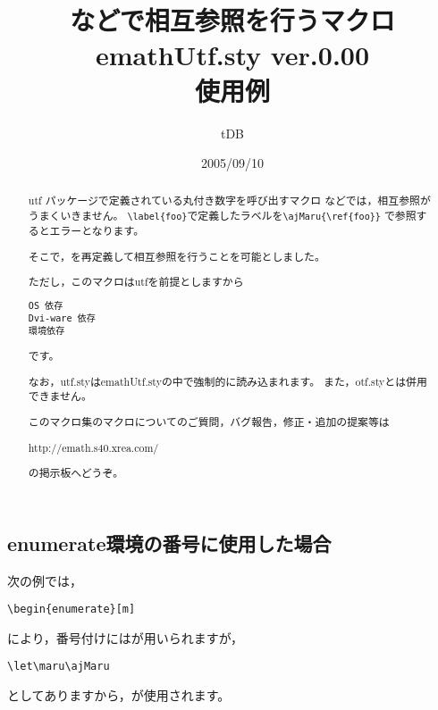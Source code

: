 \documentclass[a4j]{jarticle}
\begin{document}
\title{などで相互参照を行うマクロ\\
emathUtf.sty {\normalsize ver.0.00}\\使用例}
\author{tDB}
\date{2005/09/10}

\maketitle\thispagestyle{empty}
\begin{abstract}%
\zw%
utf パッケージで定義されている丸付き数字を呼び出すマクロ
などでは，相互参照がうまくいきません。
\verb+\label{foo}+で定義したラベルを\verb+\ajMaru{\ref{foo}}+
で参照するとエラーとなります。

そこで，を再定義して相互参照を行うことを可能としました。

ただし，このマクロは\textsf{utf}を前提としますから
\begin{jquote}
\begin{verbatim}
OS 依存
Dvi-ware 依存
環境依存
\end{verbatim}
\end{jquote}
です。

なお，\textsf{utf.sty}は\textsf{emathUtf.sty}の中で強制的に読み込まれます。
また，\textsf{otf.sty}とは併用できません。
\bigskip

このマクロ集のマクロについてのご質問，バグ報告，修正・追加の提案等は
\begin{center}
http://emath.s40.xrea.com/
\end{center}
の掲示板へどうぞ。
\end{abstract}

\tableofcontents

\pagebreak


\section{}
\subsection{enumerate環境の番号に使用した場合}
次の例では，
\begin{jquote}
\begin{verbatim}
\begin{enumerate}[m]
\end{verbatim}
\end{jquote}
により，番号付けにはが用いられますが，
\begin{jquote}
\begin{verbatim}
\let\maru\ajMaru
\end{verbatim}
\end{jquote}
としてありますから，が使用されます。
\end{document}
